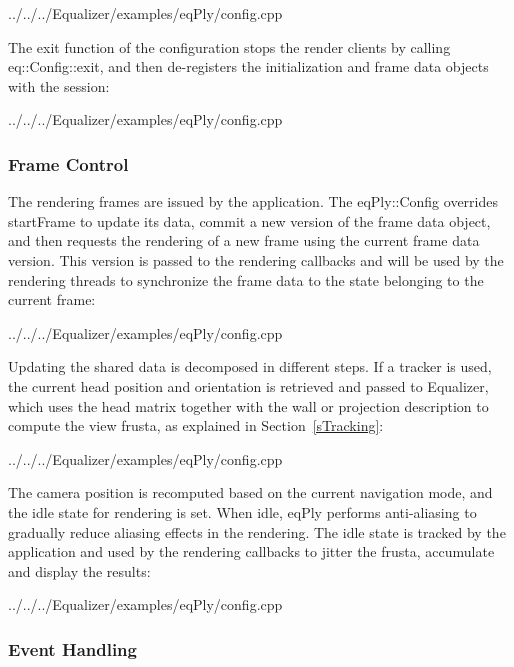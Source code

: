 \documentclass[10pt,a4]{scrartcl}
\newcommand{\sref}[1]{Section~\ref{#1}}
\begin{document}
{\footnotesize
  {../../../Equalizer/examples/eqPly/config.cpp}}

The exit function of the configuration stops the render clients by calling
\textsf{eq::Con\-fig::exit}, and then de-registers the initialization and
frame data objects with the session:

{\footnotesize
  {../../../Equalizer/examples/eqPly/config.cpp}}

\subsubsection{Frame Control}

The rendering frames are issued by the application. The \textsf{eqPly::Config}
overrides \textsf{startFrame} to update its data, commit a new version of the
frame data object, and then requests the rendering of a new frame using the
current frame data version. This version is passed to the rendering callbacks
and will be used by the rendering threads to synchronize the frame data to the
state belonging to the current frame:

{\footnotesize
  {../../../Equalizer/examples/eqPly/config.cpp}}

Updating the shared data is decomposed in different steps. If a tracker is used,
the current head position and orientation is retrieved and passed to Equalizer,
which uses the head matrix together with the wall or projection description to
compute the view frusta, as explained in \sref{sTracking}:

{\footnotesize
  {../../../Equalizer/examples/eqPly/config.cpp}}

The camera position is recomputed based on the current navigation mode, and the
idle state for rendering is set. When idle, \textsf{eqPly} performs
anti-aliasing to gradually reduce aliasing effects in the rendering. The idle
state is tracked by the application and used by the rendering callbacks to
jitter the frusta, accumulate and display the results:

{\footnotesize
  {../../../Equalizer/examples/eqPly/config.cpp}}


\subsubsection{Event Handling}
\end{document}
